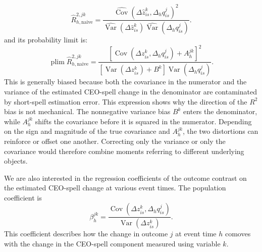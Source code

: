 \documentclass[sigconf,nonacm]{acmart}
\begin{document}
\begin{equation}
\widehat R^{2,jk}_{h,\mathrm{naive}}
=
\frac{
\widehat{\operatorname{Cov}}\!\left(
\Delta\widehat z^{k}_{is},
\Delta_{h} q^{j}_{is}
\right)^2
}{
\widehat{\operatorname{Var}}\!\left(
\Delta\widehat z^{k}_{is}
\right)
\widehat{\operatorname{Var}}\!\left(
\Delta_{h} q^{j}_{is}
\right)
}.
\end{equation}
and its probability limit is:
\begin{equation}
\operatorname{plim}
\widehat R^{2,jk}_{h,\mathrm{naive}}
=
\frac{
\left[
\operatorname{Cov}\!\left(
\Delta z^k_{is},
\Delta_h q^j_{is}
\right)
+A_h^{jk}
\right]^2
}{
\left[
\operatorname{Var}\!\left(
\Delta z^k_{is}
\right)
+B^k
\right]
\operatorname{Var}\!\left(
\Delta_h q^j_{is}
\right)
}.
\end{equation}
This is generally biased because both the covariance in the numerator and the variance of the estimated CEO-spell change in the denominator are contaminated by short-spell estimation error.
This expression shows why the direction of the $R^2$ bias is not mechanical. The nonnegative variance bias $B^k$ enters the denominator, while $A_h^{jk}$ shifts the covariance before it is squared in the numerator. Depending on the sign and magnitude of the true covariance and $A_h^{jk}$, the two distortions can reinforce or offset one another. Correcting only the variance or only the covariance would therefore combine moments referring to different underlying objects.

We are also interested in the regression coefficients of the outcome contrast on the estimated CEO-spell change at various event times. The population coefficient is
\begin{equation}
\beta_h^{jk}
=
\frac{
\operatorname{Cov}\!\left(
\Delta z_{is}^{k},
\Delta_h q_{is}^{j}
\right)
}{
\operatorname{Var}\!\left(
\Delta z_{is}^{k}
\right)
}.
\label{eq:population_beta}
\end{equation}
This coefficient describes how the change in outcome $j$ at event time
$h$ comoves with the change in the CEO-spell component measured using
variable $k$.
\end{document}
